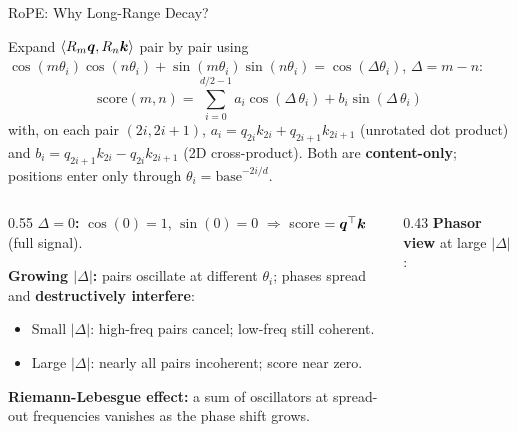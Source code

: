 \begin{frame}{RoPE: Why Long-Range Decay?}

  Expand $\langle R_m {\boldsymbol{q}}, R_n {\boldsymbol{k}}\rangle$ pair by pair using $\cos(m\theta_i)\cos(n\theta_i) + \sin(m\theta_i)\sin(n\theta_i) = \cos(\Delta\theta_i)$, $\Delta = m-n$:
  \[
    \text{score}(m,n) = \sum_{i=0}^{d/2-1} a_i \cos(\Delta\,\theta_i) + b_i \sin(\Delta\,\theta_i)
  \]
  with, on each pair $(2i, 2i{+}1)$,
  \(
    a_i = q_{2i}k_{2i} + q_{2i+1}k_{2i+1}
  \)
  (unrotated dot product) and
  \(
    b_i = q_{2i+1}k_{2i} - q_{2i}k_{2i+1}
  \)
  (2D cross-product). Both are \textbf{content-only}; positions enter only through $\theta_i = \text{base}^{-2i/d}$.

  \vspace{0.3em}
  \begin{columns}[T]
    \begin{column}{0.55\textwidth}
      \textbf{$\Delta = 0$:} $\cos(0){=}1$, $\sin(0){=}0$ $\Rightarrow$ score $= {\boldsymbol{q}}^\top {\boldsymbol{k}}$ (full signal).

      \vspace{0.3em}
      \textbf{Growing $|\Delta|$:} pairs oscillate at different $\theta_i$; phases spread and \textbf{destructively interfere}:
      \begin{itemize}
        \item Small $|\Delta|$: high-freq pairs cancel; low-freq still coherent.
        \item Large $|\Delta|$: nearly all pairs incoherent; score near zero.
      \end{itemize}

      \vspace{0.3em}
      \textbf{Riemann-Lebesgue effect:} a sum of oscillators at spread-out frequencies vanishes as the phase shift grows.
    \end{column}
    \begin{column}{0.43\textwidth}
      \centering
      {\small\textbf{Phasor view} at large $|\Delta|$:}

\end{column}
\end{columns}
\end{frame}
